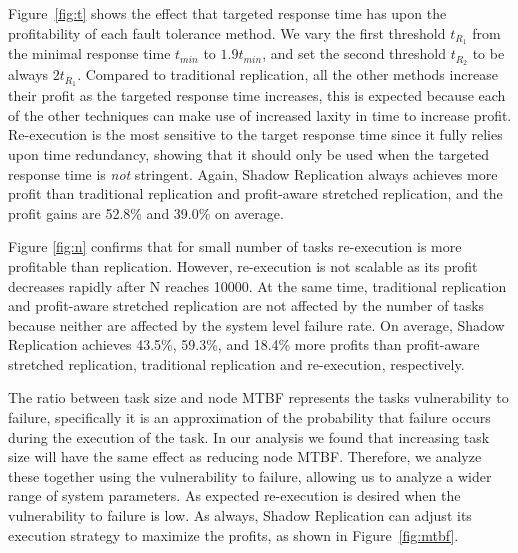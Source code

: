 Figure~\ref{fig:t} shows the effect that targeted response time has upon
the profitability of each fault tolerance method. We vary the first threshold $t_{R_1}$ from the minimal response
time $t_{min}$ to $1.9t_{min}$, and set the second threshold $t_{R_2}$
to be always $2t_{R_1}$. Compared to traditional replication, all the other methods increase their profit as the targeted
response time increases, this is expected because each of the other
techniques can make use of increased laxity in time to increase
profit. Re-execution is the most sensitive to the target response
time since it fully relies upon time redundancy, showing that it should only be used when the targeted response time is \emph{not} stringent. 
Again, Shadow Replication always achieves more profit than traditional
replication and profit-aware stretched replication, and the profit
gains are 52.8\% and 39.0\% on average. 

Figure \ref{fig:n} confirms that for small number of tasks
re-execution is more profitable than replication. However, re-execution is not scalable
as its profit decreases rapidly after N reaches 10000. At the same time, traditional
replication and profit-aware stretched replication are not
affected by the number of tasks because neither are affected by the
system level failure rate. On average, Shadow Replication achieves 43.5\%, 59.3\%, and 18.4\%
more profits than profit-aware stretched replication, traditional replication and re-execution, respectively. 

The ratio between task size and node MTBF represents the tasks
vulnerability to failure, specifically it is an approximation of the
probability that failure occurs during the execution of the task. In our
analysis we found that increasing task size will have the same effect
as reducing node MTBF. Therefore, we analyze these together using the
vulnerability to failure, allowing us to analyze a wider range of
system parameters. As expected
re-execution is desired when the vulnerability to failure is
low. As always, Shadow Replication can adjust its execution strategy to maximize the profits, as shown in Figure~\ref{fig:mtbf}.

